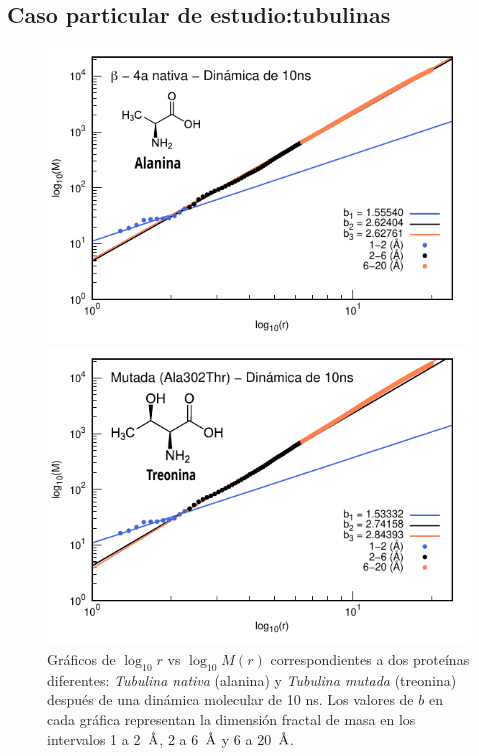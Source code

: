 	
	\subsection{Caso particular de estudio:tubulinas}
	\label{subsec:tubulinas}
	
	\begin{figure}[H]
		\hspace{-0.3cm} 
		\begin{minipage}{0.49\textwidth}
			\centering
			\includegraphics[width=\linewidth,page=1]{graphs/PDBs/Tubb4/TubNat10ns.pdf}
		\end{minipage}
		\hspace{0.2cm}
		\begin{minipage}{0.49\textwidth}
			\centering
			\includegraphics[width=\linewidth,page=1]{graphs/PDBs/Tubb4/TubMut10ns.pdf}
		\end{minipage}
		
		
		\caption{
			Gr\'{a}ficos de $\log_{10}r$ vs $\log_{10}M(r)$ correspondientes a dos prote\'{i}nas diferentes: \textit{Tubulina nativa} (alanina) y \textit{Tubulina mutada} (treonina) despu\'{e}s de una din\'{a}mica molecular de 10 ns. Los valores de $b$ en cada gr\'{a}fica representan la dimensi\'{o}n fractal de masa en los intervalos 1 a 2~$\textup{\r{A}}$, 2 a 6~$\textup{\r{A}}$ y 6 a 20~$\textup{\r{A}}$.}
		\label{fig:Tubs}
	\end{figure}
	
